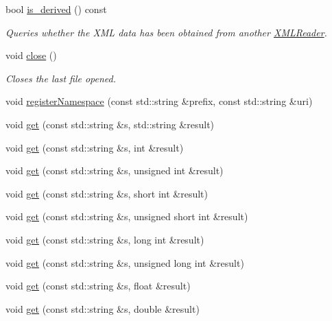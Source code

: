 \begin{DoxyCompactItemize}
bool \mbox{\hyperlink{classADATXML_1_1XMLReader_a64fb149ae8809f993a7750aa5fe1f4b7}{is\+\_\+derived}} () const
\begin{DoxyCompactList}\small\item\em Queries whether the X\+ML data has been obtained from another \mbox{\hyperlink{classADATXML_1_1XMLReader}{X\+M\+L\+Reader}}. \end{DoxyCompactList}\item 
void \mbox{\hyperlink{classADATXML_1_1XMLReader_a0e5f84d85bb03e1ba3c01a20b1642a36}{close}} ()
\begin{DoxyCompactList}\small\item\em Closes the last file opened. \end{DoxyCompactList}\item 
void \mbox{\hyperlink{classADATXML_1_1XMLReader_aeb735523fc1858850ae8a2be61a34189}{register\+Namespace}} (const std\+::string \&prefix, const std\+::string \&uri)
\item 
void \mbox{\hyperlink{classADATXML_1_1XMLReader_a5ed2bbc9de7ba505e6ce37c1a5f90fee}{get}} (const std\+::string \&s, std\+::string \&result)
\item 
void \mbox{\hyperlink{classADATXML_1_1XMLReader_a39ab72e2e614e1baed6ac3de0ce9cdca}{get}} (const std\+::string \&s, int \&result)
\item 
void \mbox{\hyperlink{classADATXML_1_1XMLReader_aa716f255bed8a98d555abcf5509d75cf}{get}} (const std\+::string \&s, unsigned int \&result)
\item 
void \mbox{\hyperlink{classADATXML_1_1XMLReader_a235808802ae29fa06b6fd441f7e50ac5}{get}} (const std\+::string \&s, short int \&result)
\item 
void \mbox{\hyperlink{classADATXML_1_1XMLReader_ac7b357f5d7f8b71ad0cd98c37283e2f8}{get}} (const std\+::string \&s, unsigned short int \&result)
\item 
void \mbox{\hyperlink{classADATXML_1_1XMLReader_a6b20ab012a431d51ee5bfd7b40eee3fb}{get}} (const std\+::string \&s, long int \&result)
\item 
void \mbox{\hyperlink{classADATXML_1_1XMLReader_ad9e43f867d48ac2b39291e2af9ec6b4a}{get}} (const std\+::string \&s, unsigned long int \&result)
\item 
void \mbox{\hyperlink{classADATXML_1_1XMLReader_a5b96d00a5503d62acd8cfbb296e6b586}{get}} (const std\+::string \&s, float \&result)
\item 
void \mbox{\hyperlink{classADATXML_1_1XMLReader_ac5f530295603b483a1b63f3b0c6e7eba}{get}} (const std\+::string \&s, double \&result)

\end{DoxyCompactItemize}
